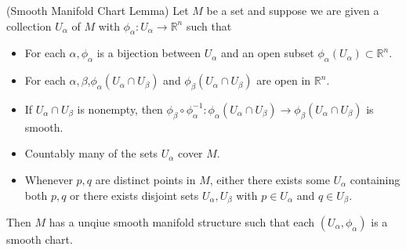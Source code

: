 \begin{lemma}(Smooth Manifold Chart Lemma)
    Let $M$ be a set and suppose we are given a collection $U_{\alpha}$ of $M$ with $\phi_{\alpha}:U_{\alpha} \to \mathbb{R}^n$ such that
    \begin{itemize}
        \item For each $\alpha,\phi_{\alpha}$ is a bijection between $U_{\alpha}$ and an open subset $\phi_{\alpha}(U_{\alpha}) \subset \mathbb{R}^n$.
        \item For each $\alpha,\beta$,$\phi_{\alpha}(U_{\alpha}\cap U_{\beta})$ and $\phi_{\beta}(U_{\alpha}\cap U_{\beta})$ are open in $\mathbb{R}^n$.
        \item If $U_{\alpha}\cap U_{\beta}$ is nonempty, then $\phi_{\beta}\circ \phi_{\alpha}^{-1} :\phi_{\alpha}(U_{\alpha} \cap U_{\beta}) \to \phi_{\beta}(U_{\alpha }\cap U_{\beta})$ is smooth.
        \item Countably many of the sets $U_{\alpha}$ cover $M$.
        \item Whenever $p,q$ are distinct points in $M$, either there exists some $U_{\alpha}$ containing both $p,q$ or there exists disjoint sets $U_{\alpha}, U_{\beta}$ with $p\in U_{\alpha}$ and $q\in U_{\beta}$.
    \end{itemize} 
    Then $M$ has a unqiue smooth manifold structure such that each $(U_{\alpha}, \phi_{\alpha})$ is a smooth chart.
\end{lemma}

